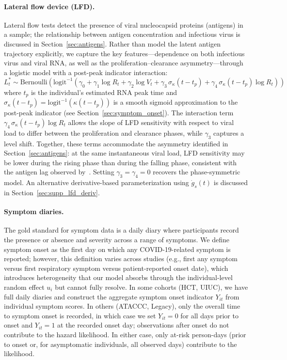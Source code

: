 \documentclass[12pt]{article}
\begin{document}
\paragraph{Lateral flow device (LFD).} Lateral flow tests detect the presence of viral nucleocapsid proteins (antigens) in a sample; the relationship between antigen concentration and infectious virus is discussed in Section~\ref{sec:antigens}. Rather than model the latent antigen trajectory explicitly, we capture the key features---dependence on both infectious virus and viral RNA, as well as the proliferation--clearance asymmetry---through a logistic model with a post-peak indicator interaction:
\begin{equation*}
    L_t^* \sim \text{Bernoulli}\!\left(\text{logit}^{-1}\!\left(\gamma_0 + \gamma_1 \log R_t + \gamma_2 \log V_t + \gamma_3 \,\sigma_\kappa(t - t_p) + \gamma_4 \,\sigma_\kappa(t - t_p) \log R_t\right)\right)
\end{equation*}
where $t_p$ is the individual's estimated RNA peak time and $\sigma_\kappa(t - t_p) = \text{logit}^{-1}(\kappa(t - t_p))$ is a smooth sigmoid approximation to the post-peak indicator (see Section~\ref{sec:symptom_onset}). The interaction term $\gamma_4 \,\sigma_\kappa(t - t_p) \log R_t$ allows the slope of LFD sensitivity with respect to viral load to differ between the proliferation and clearance phases, while $\gamma_3$ captures a level shift. Together, these terms accommodate the asymmetry identified in Section~\ref{sec:antigens}: at the same instantaneous viral load, LFD sensitivity may be lower during the rising phase than during the falling phase, consistent with the antigen lag observed by~\cite{hakki2022onset}. Setting $\gamma_3 = \gamma_4 = 0$ recovers the phase-symmetric model. An alternative derivative-based parameterization using $\dot{g}_s(t)$ is discussed in Section~\ref{sec:supp_lfd_deriv}.

\paragraph{Symptom diaries.} The gold standard for symptom data is a daily diary where participants record the presence or absence and severity across a range of symptoms. We define symptom onset as the first day on which any COVID-19-related symptom is reported; however, this definition varies across studies (e.g., first any symptom versus first respiratory symptom versus patient-reported onset date), which introduces heterogeneity that our model absorbs through the individual-level random effect $u_i$ but cannot fully resolve. In some cohorts (HCT, UIUC), we have full daily diaries and construct the aggregate symptom onset indicator $Y_{it}$ from individual symptom scores. In others (ATACCC, Legacy), only the overall time to symptom onset is recorded, in which case we set $Y_{it} = 0$ for all days prior to onset and $Y_{it} = 1$ at the recorded onset day; observations after onset do not contribute to the hazard likelihood. In either case, only at-risk person-days (prior to onset or, for asymptomatic individuals, all observed days) contribute to the likelihood.
\end{document}
